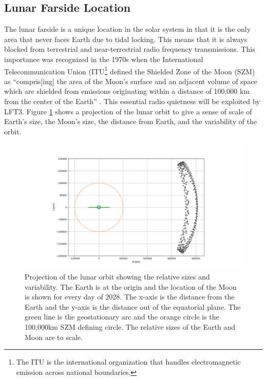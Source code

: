 \subsection{Lunar Farside Location}
The lunar farside is a unique location in the solar system in that it is the only area that never faces Earth due to tidal locking.  This means that it is always blocked from terrestrial and near-terrestrial radio frequency transmissions.  This importance was recognized in the 1970s when the International Telecommunication Union (ITU\footnote{The ITU is the international organization that handles electromagnetic emission across national boundaries.} defined the Shielded Zone of the Moon (SZM) as “compris[ing] the area of the Moon’s surface and an adjacent volume of space which are shielded from emissions originating within a distance of 100,000 km from the center of the Earth” \citep{itu_rr_2024}.  This essential radio quietness will be exploited by LFT3.  Figure \ref{fig:orbit_banana} shows a projection of the lunar orbit to give a sense of scale of Earth's size, the Moon's size, the distance from Earth, and the variability of the orbit.

\begin{figure}
	\centering
	\includegraphics[width=\linewidth]{figures/lunar_orbit_dist}
	\caption{Projection of the lunar orbit showing the relative sizes and variability. The Earth is at the origin and the location of the Moon is shown for every day of 2028. The x-axis is the distance from the Earth and the y-axis is the distance out of the equatorial plane.  The green line is the geostationary arc and the orange circle is the 100,000km SZM defining circle.  The relative sizes of the Earth and Moon are to scale.}
    \label{fig:orbit_banana}
\end{figure}

